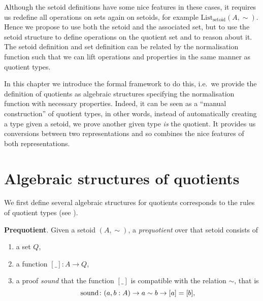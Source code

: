 Although the setoid definitions have some nice features in these cases, it requires us redefine all operations on sets again on setoids, for example $\text{List}_{\text{setoid}} (A,\sim)$.
Hence we propose to use both the setoid
and the associated set, but to use the setoid structure to define
operations on the quotient set and to reason about it. 
The setoid definition and set definition can be related by the normalisation function such that we can lift operations and properties in the same manner as quotient types.



In this chapter we introduce the formal framework to do this, i.e.\ we provide the definition of quotients as algebraic structures specifying the normalisation function with necessary properties. Indeed, it can be seen as a ``manual construction'' of quotient types, in other words,
instead of automatically creating a type given a setoid, we
prove another given type \emph{is} the quotient.
It provides us conversions between two representations and so combines the nice features of both representations. 



\section{Algebraic structures of quotients}

We first define several algebraic structures for quotients corresponds to the rules of quotient types (see ).

\begin{definition}
\textbf{Prequotient}.
\noindent
Given a setoid $(A,\sim)$,  a \emph{prequotient} over that setoid consists of
\begin{enumerate}
\item \label{enum:Q} a set $Q$,
\item \label{enum:box}a function $[\_]: A \rightarrow Q$,
\item \label{enum:sound} a proof \emph{sound} that the function $[\_]$ is compatible with the relation $\sim$,
that is \[\operatorname{sound}\colon (a,b : A) \rightarrow a\sim b \rightarrow [a] = [b],\]
\end{enumerate}
\end{definition}

